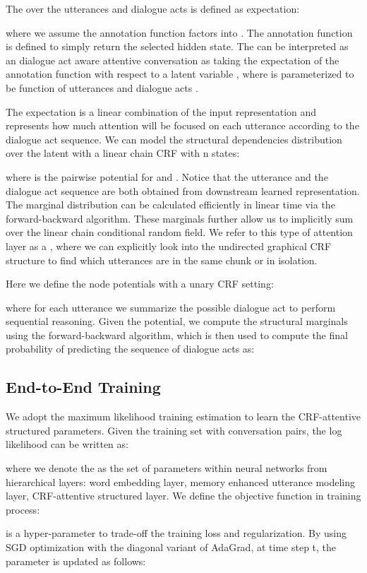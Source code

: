 \documentclass[sigconf]{acmart}
\begin{document}
The   over the utterances and dialogue acts is defined as expectation:

where we assume the annotation function  factors into . The annotation function is defined to simply return the selected hidden state. The   can be interpreted as an dialogue act aware attentive conversation as taking the expectation of the annotation function with respect to a latent variable , where  is parameterized to be function of utterances  and dialogue acts .
 
The expectation is a linear combination of the input representation and represents how much attention will be focused on each utterance according to the dialogue act sequence. We can model the structural dependencies distribution over the latent  with a linear chain CRF with n states:

where  is the pairwise potential for  and . Notice that the utterance  and the dialogue act sequence  are both obtained from downstream learned representation. The marginal distribution  can be calculated efficiently in linear time via the forward-backward algorithm. These marginals further allow us to implicitly sum over the linear chain conditional random field. We refer to this type of attention layer as a   , where we can explicitly look into the undirected graphical CRF structure to find which utterances are in the same chunk or in isolation. 

Here we define the node potentials with a unary CRF setting:

where for each utterance we summarize the possible dialogue act to perform sequential reasoning. Given the potential, we compute the structural marginals  using the forward-backward algorithm, which is then used to compute the final probability of predicting the sequence of dialogue acts as:


\subsection{End-to-End Training}
We adopt the maximum likelihood training estimation to learn the CRF-attentive structured parameters. Given the training set  with  conversation pairs, the log likelihood can be written as:

where we denote the  as the set of parameters within neural networks from hierarchical layers: word embedding layer, memory enhanced utterance modeling layer, CRF-attentive structured layer. We define the objective function in training process:

 is a hyper-parameter to trade-off the training loss and regularization. By using SGD optimization with the diagonal variant of AdaGrad, at time step t, the parameter  is updated as follows:
\end{document}

